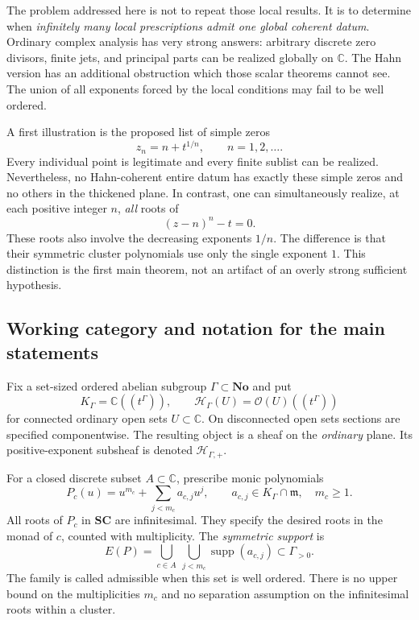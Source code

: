 \documentclass[11pt,letterpaper]{article}
\theoremstyle{definition}
\theoremstyle{remark}
\newcommand{\C}{\mathbb C}
\newcommand{\No}{\mathbf{No}}
\newcommand{\SC}{\mathbf{SC}}
\newcommand{\OO}{\mathcal O}
\newcommand{\HH}{\mathscr H_\Gamma}
\newcommand{\HP}{\mathscr H_{\Gamma,+}}
\newcommand{\mm}{\mathfrak m}
\newcommand{\KG}{K_\Gamma}
\newcommand{\supp}{\operatorname{supp}}
\numberwithin{equation}{section}
\begin{document}
The problem addressed here is not to repeat those local results. It is to determine when \emph{infinitely many local prescriptions admit one global coherent datum}. Ordinary complex analysis has very strong answers: arbitrary discrete zero divisors, finite jets, and principal parts can be realized globally on $\C$. The Hahn version has an additional obstruction which those scalar theorems cannot see. The union of all exponents forced by the local conditions may fail to be well ordered.

A first illustration is the proposed list of simple zeros
\begin{equation}\label{eq:impossibleintro}
 z_n=n+t^{1/n},\qquad n=1,2,\ldots .
\end{equation}
Every individual point is legitimate and every finite sublist can be realized. Nevertheless, no Hahn-coherent entire datum has exactly these simple zeros and no others in the thickened plane. In contrast, one can simultaneously realize, at each positive integer $n$, \emph{all} roots of
\begin{equation}\label{eq:possibleintro}
 (z-n)^n-t=0.
\end{equation}
These roots also involve the decreasing exponents $1/n$. The difference is that their symmetric cluster polynomials use only the single exponent $1$. This distinction is the first main theorem, not an artifact of an overly strong sufficient hypothesis.

\subsection{Working category and notation for the main statements}
Fix a set-sized ordered abelian subgroup $\Gamma\subset\No$ and put
\[
 \KG=\C((t^\Gamma)),\qquad
 \HH(U)=\OO(U)((t^\Gamma))
\]
for connected ordinary open sets $U\subset\C$. On disconnected open sets sections are specified componentwise. The resulting object is a sheaf on the \emph{ordinary} plane. Its positive-exponent subsheaf is denoted $\HP$.

For a closed discrete subset $A\subset\C$, prescribe monic polynomials
\begin{equation}\label{eq:clusterintro}
 P_c(u)=u^{m_c}+\sum_{j<m_c}a_{c,j}u^j,
 \qquad a_{c,j}\in\KG\cap\mm,\quad m_c\ge1.
\end{equation}
All roots of $P_c$ in $\SC$ are infinitesimal. They specify the desired roots in the monad of $c$, counted with multiplicity. The \emph{symmetric support} is
\begin{equation}\label{eq:symmetricsupportintro}
 E(P)=\bigcup_{c\in A}\ \bigcup_{j<m_c}\supp(a_{c,j})
 \subset\Gamma_{>0}.
\end{equation}
The family is called admissible when this set is well ordered. There is no upper bound on the multiplicities $m_c$ and no separation assumption on the infinitesimal roots within a cluster.
\end{document}
